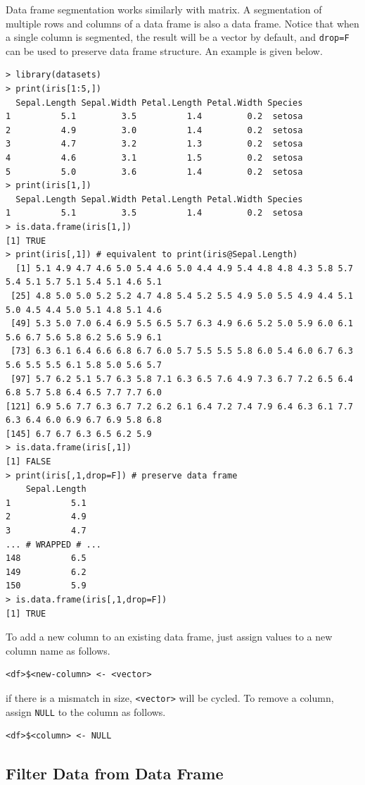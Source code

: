 Data frame segmentation works similarly with matrix. A segmentation of multiple rows and columns of a data frame is also a data frame. Notice that when a single column is segmented, the result will be a vector by default, and \verb|drop=F| can be used to preserve data frame structure. An example is given below.
\begin{lstlisting}
> library(datasets)
> print(iris[1:5,])
  Sepal.Length Sepal.Width Petal.Length Petal.Width Species
1          5.1         3.5          1.4         0.2  setosa
2          4.9         3.0          1.4         0.2  setosa
3          4.7         3.2          1.3         0.2  setosa
4          4.6         3.1          1.5         0.2  setosa
5          5.0         3.6          1.4         0.2  setosa
> print(iris[1,])
  Sepal.Length Sepal.Width Petal.Length Petal.Width Species
1          5.1         3.5          1.4         0.2  setosa
> is.data.frame(iris[1,])
[1] TRUE
> print(iris[,1]) # equivalent to print(iris@Sepal.Length)
  [1] 5.1 4.9 4.7 4.6 5.0 5.4 4.6 5.0 4.4 4.9 5.4 4.8 4.8 4.3 5.8 5.7 5.4 5.1 5.7 5.1 5.4 5.1 4.6 5.1
 [25] 4.8 5.0 5.0 5.2 5.2 4.7 4.8 5.4 5.2 5.5 4.9 5.0 5.5 4.9 4.4 5.1 5.0 4.5 4.4 5.0 5.1 4.8 5.1 4.6
 [49] 5.3 5.0 7.0 6.4 6.9 5.5 6.5 5.7 6.3 4.9 6.6 5.2 5.0 5.9 6.0 6.1 5.6 6.7 5.6 5.8 6.2 5.6 5.9 6.1
 [73] 6.3 6.1 6.4 6.6 6.8 6.7 6.0 5.7 5.5 5.5 5.8 6.0 5.4 6.0 6.7 6.3 5.6 5.5 5.5 6.1 5.8 5.0 5.6 5.7
 [97] 5.7 6.2 5.1 5.7 6.3 5.8 7.1 6.3 6.5 7.6 4.9 7.3 6.7 7.2 6.5 6.4 6.8 5.7 5.8 6.4 6.5 7.7 7.7 6.0
[121] 6.9 5.6 7.7 6.3 6.7 7.2 6.2 6.1 6.4 7.2 7.4 7.9 6.4 6.3 6.1 7.7 6.3 6.4 6.0 6.9 6.7 6.9 5.8 6.8
[145] 6.7 6.7 6.3 6.5 6.2 5.9
> is.data.frame(iris[,1])
[1] FALSE
> print(iris[,1,drop=F]) # preserve data frame
    Sepal.Length
1            5.1
2            4.9
3            4.7
... # WRAPPED # ...
148          6.5
149          6.2
150          5.9
> is.data.frame(iris[,1,drop=F])
[1] TRUE
\end{lstlisting}

To add a new column to an existing data frame, just assign values to a new column name as follows.
\begin{lstlisting}
<df>$<new-column> <- <vector>
\end{lstlisting}
if there is a mismatch in size, \verb|<vector>| will be cycled. To remove a column, assign \verb|NULL| to the column as follows.
\begin{lstlisting}
<df>$<column> <- NULL
\end{lstlisting}

\subsection{Filter Data from Data Frame}

